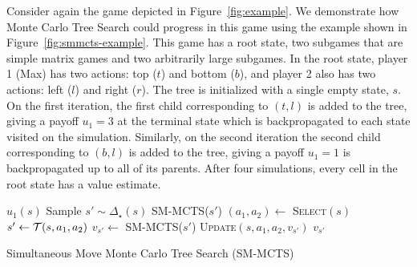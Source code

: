 Consider again the game depicted in Figure~\ref{fig:example}. We demonstrate how Monte Carlo Tree Search
could progress in this game using the example shown in Figure~\ref{fig:smmcts-example}. This game has a root state,
two subgames that are simple matrix games and two arbitrarily large subgames. In the root state, player 1 (Max) has two
actions: top ($t$) and bottom ($b$), and player 2 also has two actions: left ($l$) and right ($r$). The tree is initialized
with a single empty state, $s$. On the first iteration, the first child corresponding to $(t,l)$ is added to the tree,
giving a payoff $u_1 = 3$ at the terminal state which is backpropagated to each state visited on the simulation.
Similarly, on the second iteration the second child corresponding to $(b,l)$ is added to the tree, giving a payoff $u_1 = 1$ is
backpropagated up to all of its parents.
After four simulations, every cell in the root state has a value estimate.

\begin{algorithm2e}[t]
\small
{}
 {
	\Return $u_1(s)$\;
}
 {
        Sample $s' \sim \Delta_\star(s)$\;
	\Return SM-MCTS($s'$)\;
}
 {
	$(a_1, a_2) \leftarrow$ \textsc{Select}$(s)$\;\label{alg:smmcts:select}
	$s' \leftarrow \mathcal{T}(s,a_1,a_2)$\;
	$v_{s'} \leftarrow $ SM-MCTS($s'$)\;\label{alg:smmcts:reccall}
	\textsc{Update}$(s,a_1,a_2,v_{s'})$\;\label{alg:smmcts:up}
	\Return $v_{s'}$\;
}
\caption{Simultaneous Move Monte Carlo Tree Search (SM-MCTS)}\label{alg:smmcts}
\end{algorithm2e}

